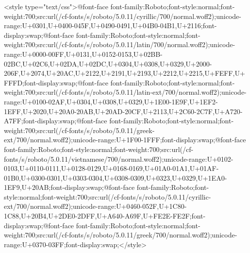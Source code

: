 <style type="text/css">@font-face {font-family:Roboto;font-style:normal;font-weight:700;src:url(/cf-fonts/s/roboto/5.0.11/cyrillic/700/normal.woff2);unicode-range:U+0301,U+0400-045F,U+0490-0491,U+04B0-04B1,U+2116;font-display:swap;}@font-face {font-family:Roboto;font-style:normal;font-weight:700;src:url(/cf-fonts/s/roboto/5.0.11/latin/700/normal.woff2);unicode-range:U+0000-00FF,U+0131,U+0152-0153,U+02BB-02BC,U+02C6,U+02DA,U+02DC,U+0304,U+0308,U+0329,U+2000-206F,U+2074,U+20AC,U+2122,U+2191,U+2193,U+2212,U+2215,U+FEFF,U+FFFD;font-display:swap;}@font-face {font-family:Roboto;font-style:normal;font-weight:700;src:url(/cf-fonts/s/roboto/5.0.11/latin-ext/700/normal.woff2);unicode-range:U+0100-02AF,U+0304,U+0308,U+0329,U+1E00-1E9F,U+1EF2-1EFF,U+2020,U+20A0-20AB,U+20AD-20CF,U+2113,U+2C60-2C7F,U+A720-A7FF;font-display:swap;}@font-face {font-family:Roboto;font-style:normal;font-weight:700;src:url(/cf-fonts/s/roboto/5.0.11/greek-ext/700/normal.woff2);unicode-range:U+1F00-1FFF;font-display:swap;}@font-face {font-family:Roboto;font-style:normal;font-weight:700;src:url(/cf-fonts/s/roboto/5.0.11/vietnamese/700/normal.woff2);unicode-range:U+0102-0103,U+0110-0111,U+0128-0129,U+0168-0169,U+01A0-01A1,U+01AF-01B0,U+0300-0301,U+0303-0304,U+0308-0309,U+0323,U+0329,U+1EA0-1EF9,U+20AB;font-display:swap;}@font-face {font-family:Roboto;font-style:normal;font-weight:700;src:url(/cf-fonts/s/roboto/5.0.11/cyrillic-ext/700/normal.woff2);unicode-range:U+0460-052F,U+1C80-1C88,U+20B4,U+2DE0-2DFF,U+A640-A69F,U+FE2E-FE2F;font-display:swap;}@font-face {font-family:Roboto;font-style:normal;font-weight:700;src:url(/cf-fonts/s/roboto/5.0.11/greek/700/normal.woff2);unicode-range:U+0370-03FF;font-display:swap;}</style>
